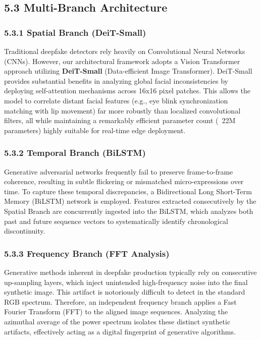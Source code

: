 \documentclass[12pt,a4paper]{article}
\begin{document}
\subsection{5.3 Multi-Branch Architecture}
\subsubsection{5.3.1 Spatial Branch (DeiT-Small)}
Traditional deepfake detectors rely heavily on Convolutional Neural Networks (CNNs). However, our architectural framework adopts a Vision Transformer approach utilizing \textbf{DeiT-Small} (Data-efficient Image Transformer). DeiT-Small provides substantial benefits in analyzing global facial inconsistencies by deploying self-attention mechanisms across 16x16 pixel patches. This allows the model to correlate distant facial features (e.g., eye blink synchronization matching with lip movement) far more robustly than localized convolutional filters, all while maintaining a remarkably efficient parameter count (~22M parameters) highly suitable for real-time edge deployment.

\subsubsection{5.3.2 Temporal Branch (BiLSTM)}
Generative adversarial networks frequently fail to preserve frame-to-frame coherence, resulting in subtle flickering or mismatched micro-expressions over time. To capture these temporal discrepancies, a Bidirectional Long Short-Term Memory (BiLSTM) network is employed. Features extracted consecutively by the Spatial Branch are concurrently ingested into the BiLSTM, which analyzes both past and future sequence vectors to systematically identify chronological discontinuity.

\subsubsection{5.3.3 Frequency Branch (FFT Analysis)}
Generative methods inherent in deepfake production typically rely on consecutive up-sampling layers, which inject unintended high-frequency noise into the final synthetic image. This artifact is notoriously difficult to detect in the standard RGB spectrum. Therefore, an independent frequency branch applies a Fast Fourier Transform (FFT) to the aligned image sequences. Analyzing the azimuthal average of the power spectrum isolates these distinct synthetic artifacts, effectively acting as a digital fingerprint of generative algorithms.
\end{document}

